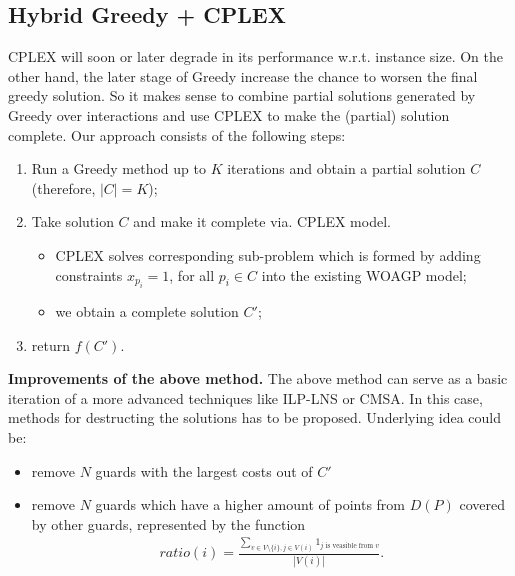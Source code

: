\documentclass[runningheads,a4paper]{llncs}
\begin{document}
    \subsection{Hybrid Greedy + CPLEX}
        CPLEX will soon or later degrade in its performance w.r.t. instance size. On the other hand, the later stage of Greedy increase the chance to worsen the final greedy solution.  So it makes sense to combine  partial solutions generated by  Greedy over interactions  and use CPLEX to make the (partial)  solution complete. Our approach consists of the following steps:
        \begin{enumerate}
        	\item Run a Greedy method up to $K$ iterations and obtain a partial solution $C$ (therefore, $|C| = K$); 
        	\item Take solution $C$ and make it complete via. CPLEX model. 
        	\begin{itemize}
        		\item CPLEX solves corresponding sub-problem which is formed by adding constraints $x_{p_i} = 1$, for all $p_i \in C$ into the existing WOAGP model;
        		\item we obtain a complete solution $C'$;
        	\end{itemize}
            \item return $f(C')$. 
        \end{enumerate}
          
       \noindent \textbf{Improvements of the above method.} The above method can serve as a basic iteration 
       of a more advanced techniques like ILP-LNS or CMSA. In this case, methods for destructing the solutions 
       has to be proposed.  Underlying idea could be:
       \begin{itemize}
       	    \item remove $N$ guards with the largest costs out of $C'$
       	    \item remove $N$ guards which have a higher amount of points from $D(P)$ covered by other guards, represented by the function
       	    \begin{align}
       	       ratio(i) = \frac{\sum_{v \in V\setminus{ \{i\}}, j \in V(i)} 1_{j \mbox{ is veasible from } v} }{|V(i)|}. 
       	    \end{align}
       \end{itemize}
       
    
\end{document}
